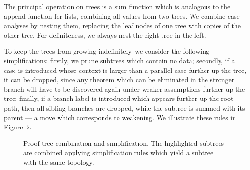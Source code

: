 \begin{figure}
  \label{fig:Tree}
\end{figure}

The principal operation on trees is a sum function which is analogous to the append function for lists, combining all values from two trees. We combine case-analyses by nesting them, replacing the leaf nodes of one tree with copies of the other tree. For definiteness, we always nest the right tree in the left.

To keep the trees from growing indefinitely, we consider the following  simplifications: firstly, we prune subtrees which contain no data; secondly, if a case is introduced whose context is larger than a parallel case further up the tree, it can be dropped, since any theorem which can be eliminated in the stronger branch will have to be discovered again under weaker assumptions further up the tree; finally, if a branch label is introduced which appears further up the root path, then all sibling branches are dropped, while the subtree is summed with its parent --- a move which corresponds to weakening. We illustrate these rules in Figure~\ref{fig:CombineExample}.

\begin{figure}
\caption{Proof tree combination and simplification. The highlighted subtrees are combined applying simplification rules which yield a subtree with the same topology.}
\label{fig:CombineExample}
\end{figure}

